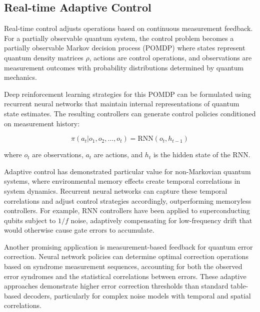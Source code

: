 \subsection{Real-time Adaptive Control}

Real-time control adjusts operations based on continuous measurement feedback. For a partially observable quantum system, the control problem becomes a partially observable Markov decision process (POMDP) where states represent quantum density matrices $\rho$, actions are control operations, and observations are measurement outcomes with probability distributions determined by quantum mechanics.

Deep reinforcement learning strategies for this POMDP can be formulated using recurrent neural networks that maintain internal representations of quantum state estimates. The resulting controllers can generate control policies conditioned on measurement history:

\begin{equation}
\pi(a_t | o_1, o_2, \ldots, o_t) = \text{RNN}(o_t, h_{t-1})
\end{equation}

where $o_t$ are observations, $a_t$ are actions, and $h_t$ is the hidden state of the RNN.

Adaptive control has demonstrated particular value for non-Markovian quantum systems, where environmental memory effects create temporal correlations in system dynamics. Recurrent neural networks can capture these temporal correlations and adjust control strategies accordingly, outperforming memoryless controllers. For example, RNN controllers have been applied to superconducting qubits subject to $1/f$ noise, adaptively compensating for low-frequency drift that would otherwise cause gate errors to accumulate.

Another promising application is measurement-based feedback for quantum error correction. Neural network policies can determine optimal correction operations based on syndrome measurement sequences, accounting for both the observed error syndromes and the statistical correlations between errors. These adaptive approaches demonstrate higher error correction thresholds than standard table-based decoders, particularly for complex noise models with temporal and spatial correlations.

